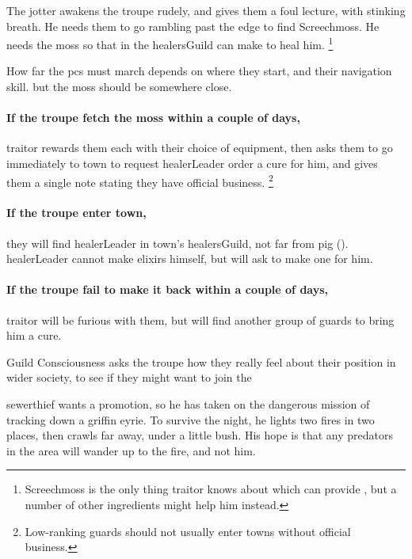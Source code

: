 \noindent
The \gls{jotter} awakens the troupe rudely, and gives them a foul lecture, with stinking breath.
He needs them to go \gls{rambling} past the \gls{edge} to find Screechmoss.%
He needs the moss so that  in the \gls{healersGuild} can make  to heal him.%
\footnote{Screechmoss is the only thing \gls{traitor} knows about which can provide , but a number of other \glspl{ingredient} might help him instead.}

How far the \glspl{pc} must march depends on where they start, and their \gls{navigation} skill.%
but the moss should be somewhere close.

\paragraph{If the troupe fetch the moss within a couple of days,}
\gls{traitor} rewards them each with their choice of equipment, then asks them to go immediately to \gls{town} to request \gls{healerLeader} order a cure for him, and gives them a single note stating they have official business.%
\footnote{Low-ranking \glspl{guard} should not usually enter towns without official business.}

\paragraph{If the troupe enter \gls{town},}
they will find \gls{healerLeader} in \gls{town}'s \gls{healersGuild}, not far from \gls{pig} ().
\gls{healerLeader} cannot make \glspl{elixir} himself, but will ask  to make one for him.

\paragraph{If the troupe fail to make it back within a couple of days,}
\gls{traitor} will be furious with them, but will find another group of \glspl{guard} to bring him a cure.

{Guild Consciousness}%
{ asks the troupe how they really feel about their position in wider society, to see if they might want to join the }%

\Gls{sewerthief} wants a promotion, so he has taken on the dangerous mission of tracking down a griffin eyrie.
To survive the night, he lights two fires in two places, then crawls far away, under a little bush.
His hope is that any predators in the area will wander up to the fire, and not him.

